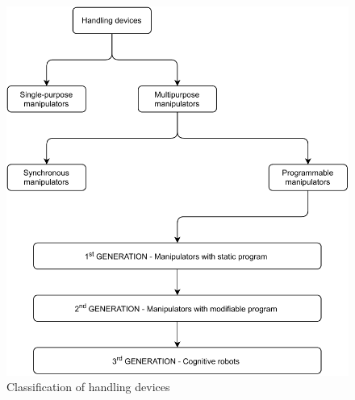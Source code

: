 \begin{figure}[h]
    \centering
    \includegraphics[width=0.8\linewidth]{img/manipulators.pdf}
    \caption{Classification of handling devices \protect\cite{vsb_2007}}
    \label{fig:manipulators}
\end{figure}


